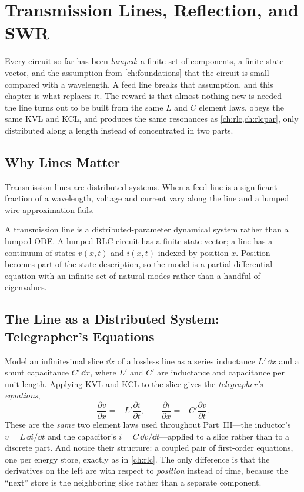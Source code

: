 \chapter{Transmission Lines, Reflection, and SWR}
\label{ch:lines}
Every circuit so far has been \emph{lumped}: a finite set of components, a finite
state vector, and the assumption from \cref{ch:foundations} that the circuit is
small compared with a wavelength. A feed line breaks that assumption, and this
chapter is what replaces it. The reward is that almost nothing new is needed---the
line turns out to be built from the same \(L\) and \(C\) element laws, obeys the
same KVL and KCL, and produces the same resonances as \cref{ch:rlc,ch:rlcpar}, only
distributed along a length instead of concentrated in two parts.

\section{Why Lines Matter}
Transmission lines are distributed systems. When a feed line is a significant
fraction of a wavelength, voltage and current vary along the line and a lumped
wire approximation fails.

\begin{controlsbox}
A transmission line is a distributed-parameter dynamical system rather than a
lumped ODE. A lumped RLC circuit has a finite state vector; a line has a
continuum of states \(v(x,t)\) and \(i(x,t)\) indexed by position \(x\). Position
becomes part of the state description, so the model is a partial differential
equation with an infinite set of natural modes rather than a handful of
eigenvalues.
\end{controlsbox}

\section{The Line as a Distributed System: Telegrapher's Equations}
Model an infinitesimal slice \(\dd x\) of a lossless line as a series inductance
\(L'\,\dd x\) and a shunt capacitance \(C'\,\dd x\), where \(L'\) and \(C'\) are
inductance and capacitance per unit length. Applying KVL and KCL to the slice
gives the \emph{telegrapher's equations},
\[
\frac{\partial v}{\partial x}=-L'\frac{\partial i}{\partial t},
\qquad
\frac{\partial i}{\partial x}=-C'\frac{\partial v}{\partial t}.
\]
These are the \emph{same} two element laws used throughout Part~III---the inductor's
\(v=L\,\dd i/\dd t\) and the capacitor's \(i=C\,\dd v/\dd t\)---applied to a slice
rather than to a discrete part. And notice their structure: a coupled pair of
first-order equations, one per energy store, exactly as in \cref{ch:rlc}. The only
difference is that the derivatives on the left are with respect to \emph{position}
instead of time, because the ``next'' store is the neighboring slice rather than a
separate component.

